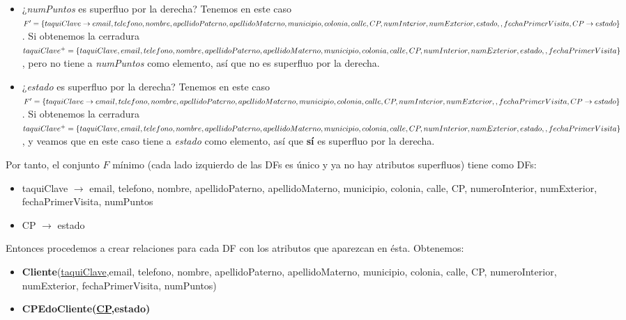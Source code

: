 \documentclass[11pt,letterpaper]{article}
\begin{document}
\begin{itemize}
\begin{itemize}
\item ¿\textit{numPuntos} es superfluo por la derecha? Tenemos en este caso $F'=\{taquiClave \rightarrow email, telefono, nombre, apellidoPaterno,  apellidoMaterno,\\municipio, colonia, calle, CP, numInterior, numExterior, estado,\\, fechaPrimerVisita, CP\rightarrow estado\}$. Si obtenemos la cerradura $taquiClave^+=\{taquiClave,email, telefono, nombre,\\ apellidoPaterno,  apellidoMaterno,\\municipio, colonia, calle, CP, numInterior,numExterior, estado,\\, fechaPrimerVisita\}$, pero no tiene a \textit{numPuntos} como elemento, así que no es superfluo por la derecha.
\item ¿\textit{estado} es superfluo por la derecha? Tenemos en este caso $F'=\{taquiClave \rightarrow email, telefono, nombre, apellidoPaterno,  apellidoMaterno,\\municipio, colonia, calle, CP, numInterior, numExterior,\\, fechaPrimerVisita, CP\rightarrow estado\}$. Si obtenemos la cerradura $taquiClave^+=\{taquiClave,email, telefono, nombre,\\ apellidoPaterno,  apellidoMaterno,\\municipio, colonia, calle, CP, numInterior,numExterior, estado,\\, fechaPrimerVisita\}$, y veamos que en este caso tiene a \textit{estado} como elemento, así que \textbf{sí} es superfluo por la derecha.
\end{itemize}

Por tanto, el conjunto $F$ mínimo (cada lado izquierdo de las DFs es único y ya no hay atributos superfluos) tiene como DFs:

\begin{itemize}
\item taquiClave $\rightarrow$ email, telefono, nombre, apellidoPaterno, apellidoMaterno,  municipio, colonia, calle, CP, numeroInterior, numExterior, fechaPrimerVisita, numPuntos
\item CP $\rightarrow$ estado
\end{itemize}

Entonces procedemos a crear relaciones para cada DF con los atributos que aparezcan en ésta. Obtenemos:

\begin{itemize}
\item {\footnotesize \textbf{Cliente}(\underline{taquiClave},email, telefono, nombre, apellidoPaterno, apellidoMaterno,  municipio, colonia, calle, CP, numeroInterior, numExterior, fechaPrimerVisita, numPuntos)}
\item {\footnotesize \textbf{CPEdoCliente(\underline{CP},estado)}}
\end{itemize}


\end{itemize}
\end{document}
